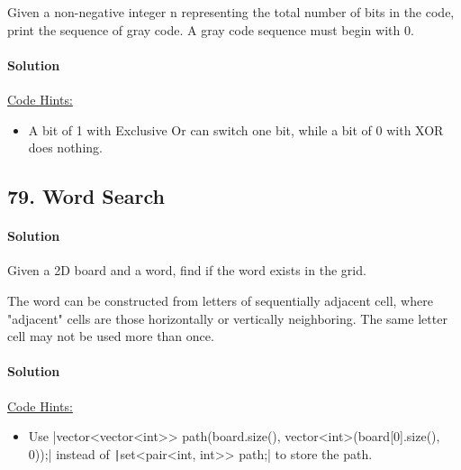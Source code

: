 Given a non-negative integer n representing the total number of bits in the code, print the sequence of gray code. A gray code sequence must begin with 0.

\paragraph{Solution}

\underline{Code Hints:}
\begin{itemize}
    \item A bit of 1 with Exclusive Or can switch one bit, while a bit of 0 with XOR does nothing.
\end{itemize}

\subsection{79. Word Search}

\paragraph{Solution}

Given a 2D board and a word, find if the word exists in the grid.

The word can be constructed from letters of sequentially adjacent cell, where "adjacent" cells are those horizontally or vertically neighboring. The same letter cell may not be used more than once.

\paragraph{Solution}

\underline{Code Hints:}
\begin{itemize}
    \item Use |vector<vector<int>> path(board.size(), vector<int>(board[0].size(), 0));| instead of \texttt|set<pair<int, int>> path;| to store the path.
\end{itemize}